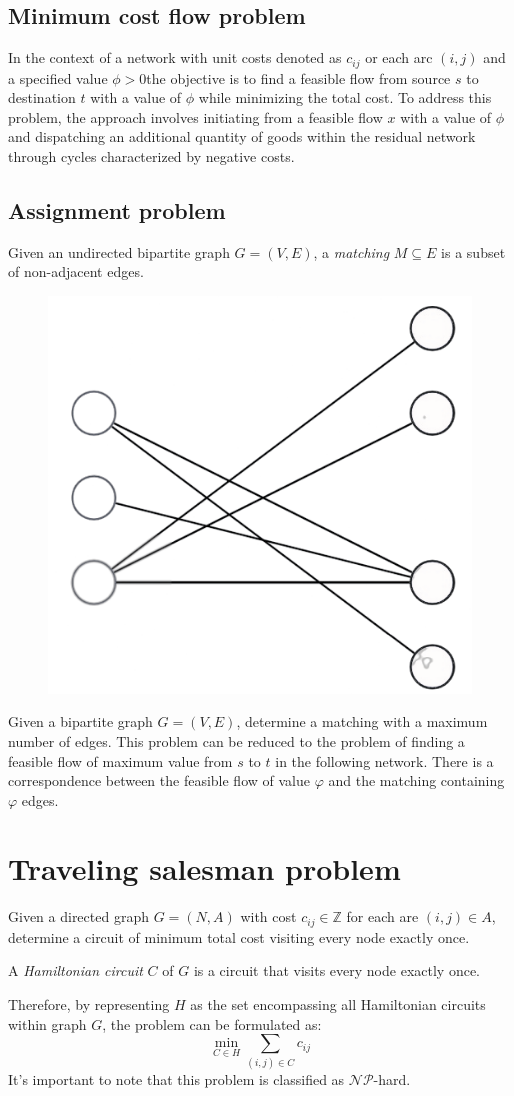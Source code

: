 \documentclass[12pt, a4paper]{report}
\begin{document}
    \subsection{Minimum cost flow problem}
    In the context of a network with unit costs denoted as $c_{ij}$ or each arc  $(i,j)$ and a specified value $\phi > 0$the objective is to find a feasible flow from source $s$ to destination $t$ with a value of $\phi$ while minimizing the total cost.
    To address this problem, the approach involves initiating from a feasible flow $x$ with a value of $\phi$ and dispatching an additional quantity of goods within the residual network through cycles characterized by negative costs.
    
    \subsection{Assignment problem}
    \begin{definition}
        Given an undirected bipartite graph $G=(V,E)$, a \emph{matching} $M \subseteq E$ is a subset of non-adjacent edges. 
    \end{definition}
    \begin{figure}[H]
        \centering
        \includegraphics[width=0.2\linewidth]{images/matching.png}
    \end{figure}
    Given a bipartite graph $G=(V,E)$, determine a matching with a maximum number of edges. 
    This problem can be reduced to the problem of finding a feasible flow of maximum value from $s$ to $t$ in the following network. 
    There is a correspondence between the feasible flow of value $\varphi$ and the matching containing $\varphi$ edges. 

    \section{Traveling salesman problem}
    Given a directed graph $G=(N,A)$ with cost $c_{ij} \in \mathbb{Z}$ for each are $(i,j) \in A$, determine a circuit of minimum total cost visiting every node exactly once. 
    \begin{definition}
        A \emph{Hamiltonian circuit} $C$ of $G$ is a circuit that visits every node exactly once. 
    \end{definition}
    Therefore, by representing $H$ as the set encompassing all Hamiltonian circuits within graph $G$, the problem can be formulated as:
    \[\min_{C \in H}{\sum_{(i,j) \in C}{c_{ij}}}\]
    It's important to note that this problem is classified as $\mathcal{N}\mathcal{P}$-hard. 
\end{document}
